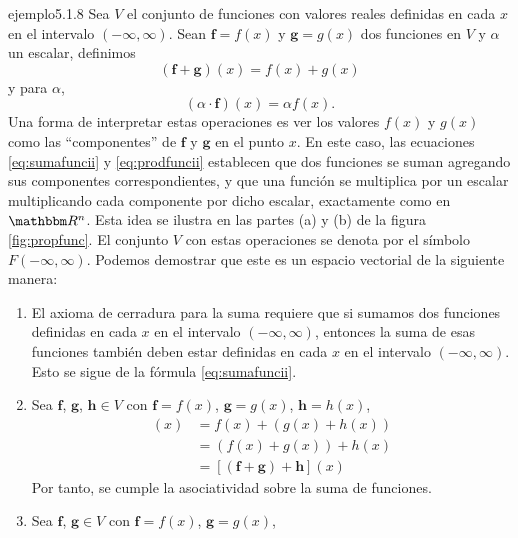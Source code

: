 \begin{examplebox}{}{ejemplo5.1.8}
    Sea $V$ el conjunto de funciones con valores reales definidas en cada $x$ en el intervalo $(-\infty, \infty)$. Sean $\mathbf{f} = f(x)$ y $\mathbf{g} = g(x)$ dos funciones en $V$ y $\alpha$ un escalar, definimos
    \begin{equation}
        (\mathbf{f} + \mathbf{g})(x) = f(x) + g(x) \label{eq:sumafuncii}
    \end{equation}
    y para $\alpha$,
    \begin{equation}
        (\alpha \cdot \mathbf{f})(x) = \alpha f(x). \label{eq:prodfuncii}
    \end{equation}
    Una forma de interpretar estas operaciones es ver los valores $f(x)$ y $g(x)$ como las “componentes” de $\mathbf{f}$ y $\mathbf{g}$ en el punto $x$. En este caso, las ecuaciones \eqref{eq:sumafuncii} y \eqref{eq:prodfuncii} establecen que dos funciones se suman agregando sus componentes correspondientes, y que una función se multiplica por un escalar multiplicando cada componente por dicho escalar, exactamente como en $\RR[n]$. Esta idea se ilustra en las partes (a) y (b) de la figura \ref{fig:propfunc}. El conjunto $V$ con estas operaciones se denota por el símbolo $F(-\infty, \infty)$. Podemos demostrar que este es un espacio vectorial de la siguiente manera:
    \begin{enumerate}[label=\roman*), topsep=6pt, itemsep=0pt]
        \item El axioma de cerradura para la suma requiere que si sumamos dos funciones definidas en cada $x$ en el intervalo $(-\infty, \infty)$, entonces la suma de esas funciones también deben estar definidas en cada $x$ en el intervalo $(-\infty, \infty)$. Esto se sigue de la fórmula \eqref{eq:sumafuncii}.
        \item Sea $\mathbf{f}$, $\mathbf{g}$, $\mathbf{h} \in V$ con $\mathbf{f} = f(x)$, $\mathbf{g} = g(x)$, $\mathbf{h} = h(x)$,
        \begin{align*}
            [\mathbf{f} + (\mathbf{g} + \mathbf{h})](x) & = f(x) + (g(x) + h(x)) \\
            & = (f(x) + g(x)) + h(x) \\
            & = [(\mathbf{f} + \mathbf{g}) + \mathbf{h}](x)
        \end{align*}
        Por tanto, se cumple la asociatividad sobre la suma de funciones.
        \item Sea $\mathbf{f}$, $\mathbf{g} \in V$ con $\mathbf{f} = f(x)$, $\mathbf{g} = g(x)$,
        \begin{align*}

\end{align*}
\end{enumerate}
\end{examplebox}
